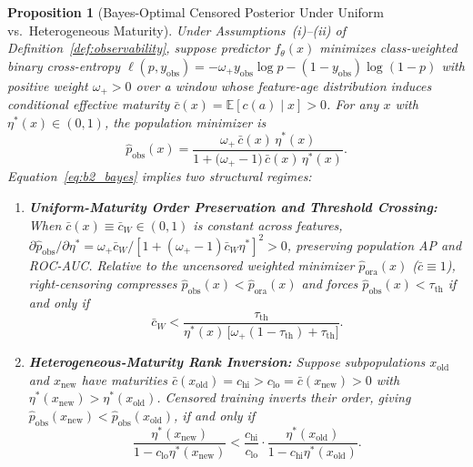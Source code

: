 \documentclass[pdflatex,sn-basic]{sn-jnl}
\theoremstyle{definition}
\theoremstyle{plain}
\newtheorem{proposition}{Proposition}
\begin{document}
\begin{proposition}[Bayes-Optimal Censored Posterior Under Uniform vs.\ Heterogeneous Maturity]
\label{prop:bias}
Under Assumptions~(i)--(ii) of Definition~\ref{def:observability}, suppose predictor $f_\theta(x)$ minimizes class-weighted binary cross-entropy $\ell(p, y_{\text{obs}}) = -\omega_+ y_{\text{obs}} \log p - (1 - y_{\text{obs}})\log(1 - p)$ with positive weight $\omega_+ > 0$ over a window whose feature-age distribution induces conditional effective maturity $\bar{c}(x) = \mathbb{E}[c(a) \mid x] > 0$. For any $x$ with $\eta^*(x) \in (0, 1)$, the population minimizer is
\begin{equation}
  \hat{p}_{\text{obs}}(x) = \frac{\omega_+ \, \bar{c}(x) \, \eta^*(x)}{1 + \big(\omega_+ - 1\big)\,\bar{c}(x)\,\eta^*(x)}.
  \label{eq:b2_bayes}
\end{equation}
Equation~\eqref{eq:b2_bayes} implies two structural regimes:
\begin{enumerate}[leftmargin=1.8em,itemsep=0.03em,topsep=0.2em]
  \item \textbf{Uniform-Maturity Order Preservation and Threshold Crossing:} When $\bar{c}(x) \equiv \bar{c}_W \in (0, 1)$ is constant across features, $\partial \hat{p}_{\text{obs}}/\partial \eta^* = \omega_+ \bar{c}_W / [1 + (\omega_+ - 1)\bar{c}_W \eta^*]^2 > 0$, preserving population AP and ROC-AUC. Relative to the uncensored weighted minimizer $\hat{p}_{\text{ora}}(x)$ ($\bar{c} \equiv 1$), right-censoring compresses $\hat{p}_{\text{obs}}(x) < \hat{p}_{\text{ora}}(x)$ and forces $\hat{p}_{\text{obs}}(x) < \tau_{\text{th}}$ if and only if
  \begin{equation}
    \bar{c}_W < \frac{\tau_{\text{th}}}{\eta^*(x)\,\big[\omega_+(1 - \tau_{\text{th}}) + \tau_{\text{th}}\big]}.
    \label{eq:exact_crossing}
  \end{equation}
  \item \textbf{Heterogeneous-Maturity Rank Inversion:} Suppose subpopulations $x_{\text{old}}$ and $x_{\text{new}}$ have maturities $\bar{c}(x_{\text{old}}) = c_{\text{hi}} > c_{\text{lo}} = \bar{c}(x_{\text{new}}) > 0$ with $\eta^*(x_{\text{new}}) > \eta^*(x_{\text{old}})$. Censored training inverts their order, giving $\hat{p}_{\text{obs}}(x_{\text{new}}) < \hat{p}_{\text{obs}}(x_{\text{old}})$, if and only if
  \begin{equation*}
    \frac{\eta^*(x_{\text{new}})}{1 - c_{\text{lo}}\eta^*(x_{\text{new}})} < \frac{c_{\text{hi}}}{c_{\text{lo}}} \cdot \frac{\eta^*(x_{\text{old}})}{1 - c_{\text{hi}}\eta^*(x_{\text{old}})}.
  \end{equation*}
\end{enumerate}
\end{proposition}
\end{document}
